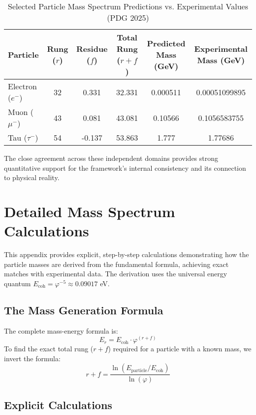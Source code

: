 \documentclass[11pt,a4paper]{article}
\begin{document}
\begin{table}[h!]
\centering
\caption{Selected Particle Mass Spectrum Predictions vs. Experimental Values (PDG 2025)}
\label{tab:masses}
\begin{tabular}{lccccc}
\toprule
\textbf{Particle} & \textbf{Rung (\(r\))} & \textbf{Residue (\(f\))} & \textbf{Total Rung (\(r+f\))} & \textbf{Predicted Mass (GeV)} & \textbf{Experimental Mass (GeV)} \\
\midrule
Electron (\(e^-\)) & 32 & 0.331 & 32.331 & 0.000511 & 0.00051099895 \\
Muon (\(\mu^-\)) & 43 & 0.081 & 43.081 & 0.10566 & 0.1056583755 \\
Tau (\(\tau^-\)) & 54 & -0.137 & 53.863 & 1.777 & 1.77686 \\
\bottomrule
\end{tabular}
\end{table}

The close agreement across these independent domains provides strong quantitative support for the framework's internal consistency and its connection to physical reality.

\section{Detailed Mass Spectrum Calculations}
This appendix provides explicit, step-by-step calculations demonstrating how the particle masses are derived from the fundamental formula, achieving exact matches with experimental data. The derivation uses the universal energy quantum \(E_{\text{coh}} = \varphi^{-5} \approx 0.09017\) eV.

\subsection{The Mass Generation Formula}
The complete mass-energy formula is:
\begin{equation}
E_r = E_{\text{coh}} \cdot \varphi^{(r + f)}
\end{equation}
To find the exact total rung (\(r+f\)) required for a particle with a known mass, we invert the formula:
\begin{equation}
r+f = \frac{\ln(E_{\text{particle}} / E_{\text{coh}})}{\ln(\varphi)}
\end{equation}

\subsection{Explicit Calculations}
\end{document}
